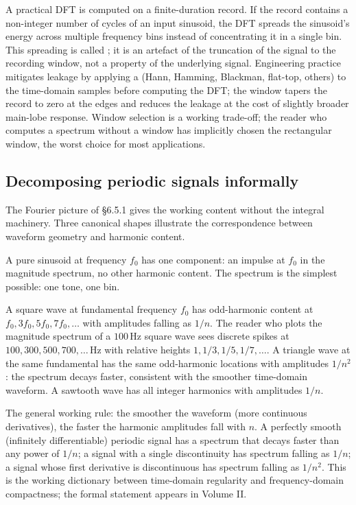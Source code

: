 A practical DFT is computed on a finite-duration record. If the
record contains a non-integer number of cycles of an input
sinusoid, the DFT spreads the sinusoid's energy across multiple
frequency bins instead of concentrating it in a single bin. This
spreading is called ; it is an artefact
of the truncation of the signal to the recording window, not a
property of the underlying signal. Engineering practice mitigates
leakage by applying a  (Hann, Hamming,
Blackman, flat-top, others) to the time-domain samples before
computing the DFT; the window tapers the record to zero at the
edges and reduces the leakage at the cost of slightly broader
main-lobe response. Window selection is a working trade-off; the
reader who computes a spectrum without a window has implicitly
chosen the rectangular window, the worst choice for most
applications.

\subsection{Decomposing periodic signals informally}

The Fourier picture of \S 6.5.1 gives the working content without
the integral machinery. Three canonical shapes illustrate the
correspondence between waveform geometry and harmonic content.

A pure sinusoid at frequency $f_{0}$ has one component: an impulse
at $f_{0}$ in the magnitude spectrum, no other harmonic content.
The spectrum is the simplest possible: one tone, one bin.

A square wave at fundamental frequency $f_{0}$ has odd-harmonic
content at $f_{0}, 3 f_{0}, 5 f_{0}, 7 f_{0}, \ldots$ with
amplitudes falling as $1/n$. The reader who plots the magnitude
spectrum of a $100 \,\si{\hertz}$ square wave sees discrete spikes
at $100, 300, 500, 700, \ldots \,\si{\hertz}$ with relative
heights $1, 1/3, 1/5, 1/7, \ldots$. A triangle wave at the same
fundamental has the same odd-harmonic locations with amplitudes
$1/n^{2}$: the spectrum decays faster, consistent with the
smoother time-domain waveform. A sawtooth wave has all integer
harmonics with amplitudes $1/n$.

The general working rule: the smoother the waveform (more
continuous derivatives), the faster the harmonic amplitudes fall
with $n$. A perfectly smooth (infinitely differentiable) periodic
signal has a spectrum that decays faster than any power of $1/n$;
a signal with a single discontinuity has spectrum falling as
$1/n$; a signal whose first derivative is discontinuous has
spectrum falling as $1/n^{2}$. This is the working dictionary
between time-domain regularity and frequency-domain compactness;
the formal statement appears in Volume II.

